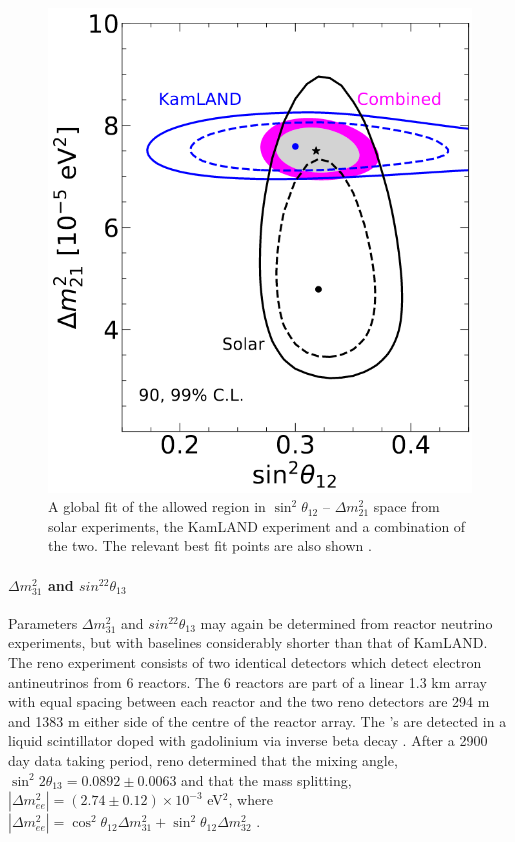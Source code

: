 \begin{figure}[h!]
    \centering
    \includegraphics[width = \smallfigwidth]{figures-chap2/theta_12.png}
    \caption[A global fit of the allowed region in $\sin^2{\theta_{12}}$ -- $\Delta m^2_{21}$ space from solar experiments and the KamLAND experiment.]{A global fit of the allowed region in $\sin^2{\theta_{12}}$ -- $\Delta m^2_{21}$ space from solar experiments, the KamLAND experiment and a combination of the two. The relevant best fit points are also shown
    \cite{2020_global_reassessment_of_the_neutrino_oscillation_picture}.}
    \label{fig:theta_21_deltamsq_21_best_fit}
\end{figure}


\paragraph{$\Delta m^2_{31}$ and $sin^22\theta_{13}$}
Parameters $\Delta m^2_{31}$ and $sin^22\theta_{13}$ may again be determined from reactor neutrino experiments, but with baselines considerably shorter than that of KamLAND. The \gls{reno} experiment consists of two identical detectors which detect electron antineutrinos from 6 reactors. The 6 reactors are part of a linear 1.3 km array with equal spacing between each reactor and the two \gls{reno} detectors are 294 m and 1383 m either side of the centre of the reactor array. The \nuebar's are detected in a liquid scintillator doped with gadolinium via inverse beta decay \cite{Measurement_of_Reactor_Antineutrino_Oscillation_Amplitude_and_Frequency_at_RENO}. After a 2900 day data taking period, \gls{reno} determined that the mixing angle, $\sin^2{2\theta_{13}} = 0.0892 \pm 0.0063$ and that the mass splitting, $|\Delta m^2_{ee}| = (2.74 \pm 0.12) \times 10^{-3}$ eV$^2$, where $|\Delta m^2_{ee}| = \cos^2{\theta_{12}}\Delta m^2_{31} + \sin^2{\theta_{12}}\Delta m^2_{32}$ \cite{RENO_2020}. 

